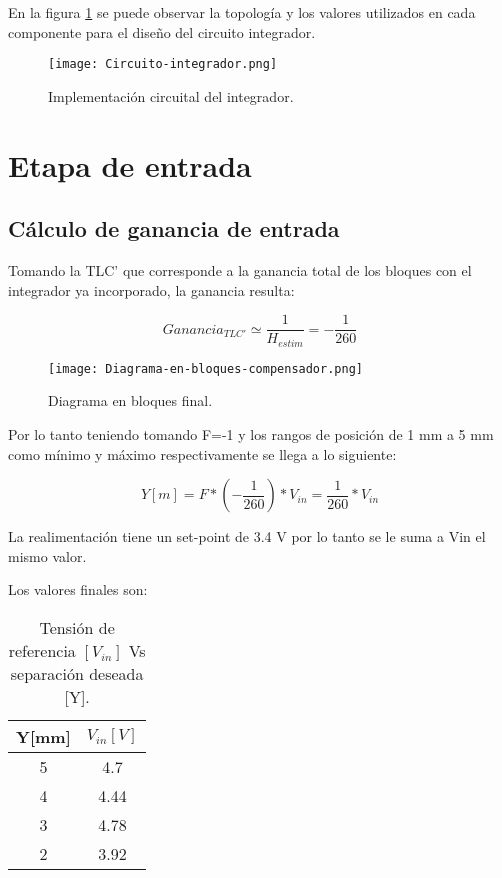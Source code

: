 \noindent En la figura \ref{fig:circuito-integrador} se puede observar la topología y los valores utilizados en cada componente para el diseño del circuito integrador. 

\begin{figure}[H]
	\centering
	\texttt{[image: Circuito-integrador.png]}
	\caption{Implementación circuital del integrador.}
	\label{fig:circuito-integrador}
	\end{figure}
\section{Etapa de entrada}
\subsection{Cálculo de ganancia de entrada}

\noindent Tomando la TLC' que corresponde a la ganancia total de los bloques con el integrador ya incorporado, la ganancia resulta:

\begin{equation} 
	Ganancia_{TLC'} \simeq \frac{1}{H_{estim}} = - \frac{1}{260}
\end{equation}

\begin{figure}[H]
	\centering
	\texttt{[image: Diagrama-en-bloques-compensador.png]}
	\caption{Diagrama en bloques final.}
	\label{fig:diag-bloques-compensador}
\end{figure}

\noindent Por lo tanto teniendo tomando F=-1 y los rangos de posición de 1 mm a 5 mm como mínimo y máximo respectivamente se llega a lo siguiente:

\begin{equation} 
	Y[m] = F * (-\frac{1}{260})*V_{in} =\frac{1}{260}*V_{in} 
\end{equation}

\noindent La realimentación tiene un set-point de 3.4 V por lo tanto se le suma a Vin el mismo valor.

\noindent Los valores finales son:


\begin{table}[H]
	\begin{center}
		\begin{tabular}{| c | c |}
			\hline
			Y[mm] & $V_{in}[V]$\\ \hline
			5 & 4.7\\ \hline
			4 & 4.44 \\ \hline
			3 & 4.78\\ \hline
			2 &	3.92 \\ \hline		
		\end{tabular}
		\caption{Tensión de referencia $[V_{in}]$ Vs separación deseada [Y].}
		\label{tension-ref-vs-separacion-deseada}
	\end{center}
\end{table}

